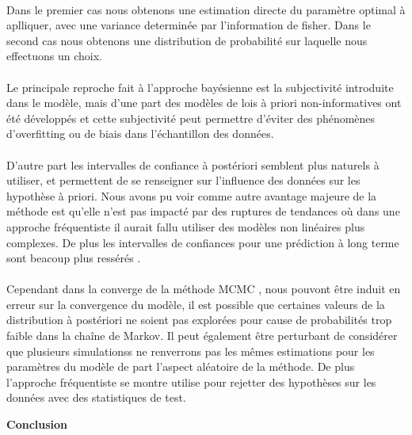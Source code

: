 \documentclass{article}
\theoremstyle{definition}
\theoremstyle{remark}
\begin{document}
{\paragraph{}
Dans le premier cas nous obtenons une estimation directe du paramètre optimal à aplliquer, avec une variance determinée par 
l'information de fisher. Dans le second cas nous obtenons une distribution de probabilité sur laquelle nous effectuons un choix.
\paragraph{}
Le principale reproche fait à l'approche bayésienne est la subjectivité introduite dans le modèle, mais d'une part des modèles de lois 
à priori non-informatives ont été développés et cette subjectivité peut permettre d'éviter des phénomènes
 d'overfitting ou de biais dans l'échantillon des données.
\paragraph{}
D'autre part les intervalles de confiance à postériori semblent plus naturels à utiliser, et permettent de se renseigner sur l'influence des données
sur les hypothèse à priori. Nous avons pu voir comme autre avantage majeure de la méthode est qu'elle n'est pas impacté par des ruptures
de tendances où dans une approche fréquentiste il aurait fallu utiliser des modèles non linéaires plus complexes. De plus les  intervalles 
de confiances pour une prédiction à long terme sont beacoup plus ressérés . 
\paragraph{}
Cependant dans la converge de la méthode MCMC , nous pouvont être induit en erreur sur la convergence du modèle, il est possible 
que certaines valeurs de la distribution à postériori ne soient pas explorées pour cause de probabilités trop faible dans la chaîne de Markov. Il peut 
également être perturbant de considérer que plusieurs simulationss ne renverrons pas les mêmes estimations pour 
les paramètres du modèle de part l'aspect aléatoire de la méthode. De plus l'approche fréquentiste se montre utilise 
pour rejetter des hypothèses sur les données avec des statistiques de test.



\newpage

\textbf{\Huge Conclusion}

}
\end{document}
